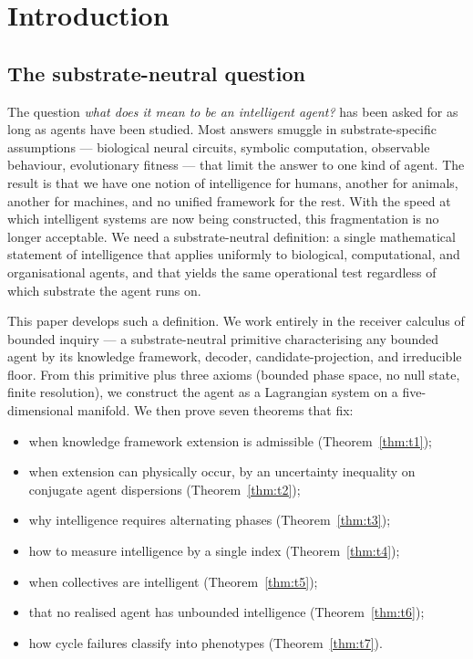 \documentclass[11pt,twocolumn,a4paper]{article}
\begin{document}
\section{Introduction}
\label{sec:intro}

\subsection{The substrate-neutral question}

The question \emph{what does it mean to be an intelligent agent?} has been asked for as
long as agents have been studied. Most answers smuggle in substrate-specific assumptions
--- biological neural circuits, symbolic computation, observable behaviour, evolutionary
fitness --- that limit the answer to one kind of agent. The result is that we have one
notion of intelligence for humans, another for animals, another for machines, and no
unified framework for the rest. With the speed at which intelligent systems are now being
constructed, this fragmentation is no longer acceptable. We need a substrate-neutral
definition: a single mathematical statement of intelligence that applies uniformly to
biological, computational, and organisational agents, and that yields the same
operational test regardless of which substrate the agent runs on.

This paper develops such a definition. We work entirely in the receiver calculus of
bounded inquiry --- a substrate-neutral primitive characterising any bounded agent by its
knowledge framework, decoder, candidate-projection, and irreducible floor. From this
primitive plus three axioms (bounded phase space, no null state, finite resolution), we
construct the agent as a Lagrangian system on a five-dimensional manifold. We then prove
seven theorems that fix:
\begin{itemize}[leftmargin=*]
\item when knowledge framework extension is admissible (Theorem~\ref{thm:t1});
\item when extension can physically occur, by an uncertainty inequality on conjugate
agent dispersions (Theorem~\ref{thm:t2});
\item why intelligence requires alternating phases (Theorem~\ref{thm:t3});
\item how to measure intelligence by a single index (Theorem~\ref{thm:t4});
\item when collectives are intelligent (Theorem~\ref{thm:t5});
\item that no realised agent has unbounded intelligence (Theorem~\ref{thm:t6});
\item how cycle failures classify into phenotypes (Theorem~\ref{thm:t7}).
\end{itemize}
\end{document}
